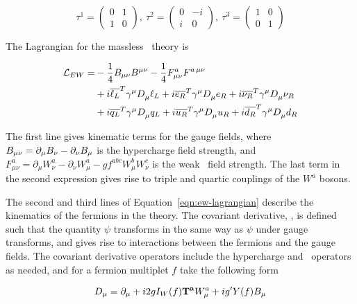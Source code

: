 \begin{equation}
\tau^{1} = \left( \begin{array}{cc} 0 & 1 \\ 1 & 0 \end{array} \right), \  
\tau^{2} = \left( \begin{array}{cc} 0 & -i \\ i & 0 \end{array} \right), \  
\tau^{3} = \left( \begin{array}{cc} 1 & 0 \\ 0 & 1 \end{array} \right)
\label{eqn:pauli-matrices}
\end{equation}

The Lagrangian for the massless \ew\ theory is

\begin{align}
\mathcal{L}_{EW}  = & - \frac{1}{4} B_{\mu\nu} B^{\mu\nu} - \frac{1}{4} F^{a}_{\mu\nu}
F^{a\,\mu\nu} \notag \\
& +  i \overline{\ell_{L}}^{T} \gamma^{\mu} D_{\mu}^{} \ell_{L} + i  \overline{e_{R}}^{T} \gamma^{\mu}
D_{\mu}^{} e_{R} + i \overline{\nu_{R}}^{T} \gamma^{\mu} D_{\mu}^{} \nu_{R} \notag \\
& +  i \overline{q_{L}}^{T} \gamma^{\mu} D_{\mu}^{} q_{L} + i  \overline{u_R}^{T} \gamma^{\mu}
D_{\mu}^{} u_R + i \overline{d_R}^{T} \gamma^{\mu} D_{\mu}^{} d_{R} 
\label{eqn:ew-lagrangian}
\end{align}

The first line gives kinematic terms for the gauge fields, where $ B_{\mu\nu} =
\partial_{\mu} B_{\nu} - \partial_{\nu} B_{\mu}$ is the hypercharge field strength,
and  $ F^{a}_{\mu\nu} =
\partial_{\mu} W^{a}_{\nu} - \partial_{\nu} W^{a}_{\mu} - g f^{abc} W^{b}_{\mu}
W^{c}_{\nu}$ is the weak \sutwo\ field strength. The last term in the second
expression gives rise to triple and quartic couplings of the $W^{a}$ bosons.

The second and third lines of Equation~\ref{eqn:ew-lagrangian} describe the
kinematics of the fermions in the theory. The covariant derivative, \Dmu, is
defined such that the quantity \Dmu$\psi$ transforms in the same way as $\psi$
under gauge transforms, and gives rise to interactions between the
fermions and the gauge fields. The covariant derivative operators include the
hypercharge and \sutwo\ operators as needed, and for a fermion multiplet $f$
take the following form

\begin{equation}
D_{\mu}  =  \partial_{\mu} + i2gI_{W}(f)\mathbf{T^{a}} W_{\mu}^{a} + ig'Y(f)B_{\mu}
\label{eqn:ew-covariant-derivative}
\end{equation}

